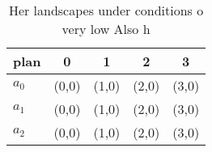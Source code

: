 \documentclass[a4paper]{article}
\begin{document}
\begin{table}
\begin{adjustbox}{width=0.5\columnwidth}
\begin{tabular}{|l|l|l|l|l|}
\hline
\textbf{plan} & \multicolumn{1}{c|}{\textbf{0}} & \multicolumn{1}{c|}{\textbf{1}} & \multicolumn{1}{c|}{\textbf{2}} & \multicolumn{1}{c|}{\textbf{3}} \\ \hline
\textbf{$a_0$}  & (0,0) & (1,0) & (2,0) & (3,0) \\ \hline
\textbf{$a_1$}  & (0,0) & (1,0) & (2,0) & (3,0) \\ \hline
\textbf{$a_2$}  & (0,0) & (1,0) & (2,0) & (3,0) \\ \hline
\end{tabular}
\end{adjustbox}
\caption{Her landscapes under conditions o very low Also h
}
\end{table}
\end{document}
